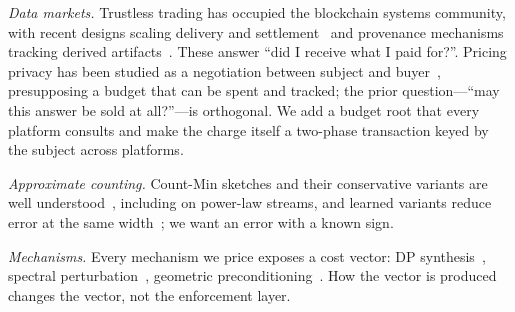 \emph{Data markets.} Trustless trading has occupied the blockchain systems community,
with recent designs scaling delivery and settlement~\cite{liu2025yotta} and provenance
mechanisms tracking derived artifacts~\cite{zhu2025auditing}. These answer ``did I
receive what I paid for?''. Pricing privacy has been studied as a negotiation between
subject and buyer~\cite{jung2019privacy}, presupposing a budget that can be spent and
tracked; the prior question---``may this answer be sold at all?''---is orthogonal. We
add a budget root that every platform consults and make the charge itself a two-phase
transaction keyed by the subject across platforms.

\emph{Approximate counting.} Count-Min sketches and their conservative variants are well
understood~\cite{fusy2023countmin,fusy2022phase}, including on power-law streams, and
learned variants reduce error at the same width~\cite{nishishita2025optimized}; we want an
error with a known sign.

\emph{Mechanisms.} Every mechanism we price exposes a cost vector: DP
synthesis~\cite{saha2024dpcda}, spectral perturbation~\cite{feng2023spectraldp},
geometric preconditioning~\cite{bosch2026dpkfc,duan2025technical}. How the vector is
produced changes the vector, not the enforcement layer.
